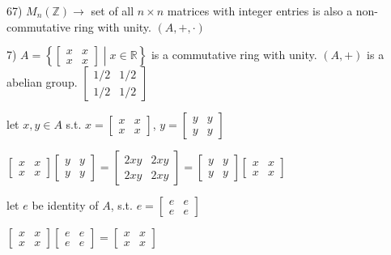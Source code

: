 67) $M_n(\mathbb{Z}) \rightarrow$ set of all $n \times n$ matrices with integer entries
is also a non-commutative ring with unity. $(A, +, \cdot)$

7) $A = \left\{ \begin{bmatrix} x & x \\ x & x \end{bmatrix} \middle| x \in \mathbb{R} \right\}$ is a commutative ring with unity.
$(A, +)$ is a abelian group. $\begin{bmatrix} 1/2 & 1/2 \\ 1/2 & 1/2 \end{bmatrix}$

let $x, y \in A$ s.t. $x = \begin{bmatrix} x & x \\ x & x \end{bmatrix}$, $y = \begin{bmatrix} y & y \\ y & y \end{bmatrix}$

$\begin{bmatrix} x & x \\ x & x \end{bmatrix} \begin{bmatrix} y & y \\ y & y \end{bmatrix} = \begin{bmatrix} 2xy & 2xy \\ 2xy & 2xy \end{bmatrix} = \begin{bmatrix} y & y \\ y & y \end{bmatrix} \begin{bmatrix} x & x \\ x & x \end{bmatrix}$

let $e$ be identity of $A$, s.t. $e = \begin{bmatrix} e & e \\ e & e \end{bmatrix}$

$\begin{bmatrix} x & x \\ x & x \end{bmatrix} \begin{bmatrix} e & e \\ e & e \end{bmatrix} = \begin{bmatrix} x & x \\ x & x \end{bmatrix}$

